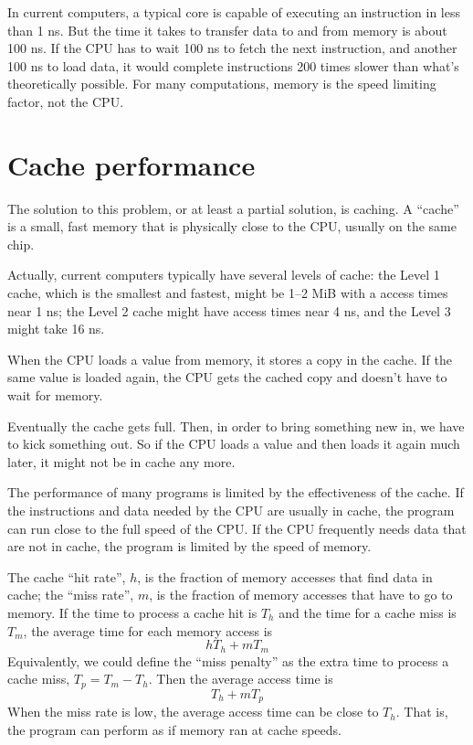 \documentclass[12pt]{book}
\begin{document}
{In current computers, a typical core is capable of executing an instruction in less than 1 ns.  But the time it takes to transfer data to and from memory is about 100 ns.  If the CPU has to wait 100 ns to fetch the next instruction, and another 100 ns to load data, it would complete instructions 200 times slower than what's theoretically possible.  For many computations, memory is the speed limiting factor, not the CPU.


\section{Cache performance}

The solution to this problem, or at least a partial solution, is
caching.  A ``cache'' is a small, fast memory that is physically close
to the CPU, usually on the same chip.


Actually, current computers typically have several levels of cache: the Level 1 cache, which is the smallest and fastest, might be 1--2 MiB with a access times near 1 ns; the Level 2 cache might have access times near 4 ns, and the Level 3 might take 16 ns.

When the CPU loads a value from memory, it stores a copy in the cache.
If the same value is loaded again, the CPU gets the cached copy
and doesn't have to wait for memory.

Eventually the cache gets full.  Then, in order to bring something
new in, we have to kick something out.  So if the CPU loads a value
and then loads it again much later, it might not be in cache any more.

The performance of many programs is limited by the effectiveness
of the cache.  If the instructions and data needed by the CPU are usually in cache, the program can run close to the full speed of the CPU.  If the CPU
frequently needs data that are not in cache, the program is
limited by the speed of memory.

The cache ``hit rate'', $h$, is the fraction of memory accesses that
find data in cache; the ``miss rate'', $m$, is the fraction of memory
accesses that have to go to memory.  If the time to process a cache
hit is $T_h$ and the time for a cache miss is $T_m$, the average time
for each memory access is
%
\[ h T_h + m T_m \]
%
Equivalently, we could define the ``miss penalty'' as the extra
time to process a cache miss, $T_p = T_m - T_h$.  Then the average access
time is
%
\[ T_h + m T_p \]
%
When the miss rate is low, the average access time can be close to
$T_h$.  That is, the program can perform as if memory ran at
cache speeds.


}
\end{document}
